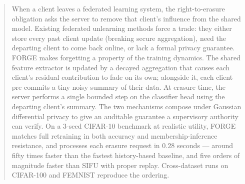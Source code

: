 \begin{abstract}
When a client leaves a federated learning system, the right-to-erasure obligation
asks the server to remove that client's influence from the shared model. Existing
federated unlearning methods force a trade: they either store every past client
update (breaking secure aggregation), need the departing client to come back
online, or lack a formal privacy guarantee. FORGE makes forgetting a property of
the training dynamics. The shared feature extractor is updated by a decayed
aggregation that causes each client's residual contribution to fade on its
own; alongside it, each client pre-commits a tiny noisy summary of their data.
At erasure time, the server performs a single bounded step on the classifier
head using the departing client's summary. The two mechanisms compose under
Gaussian differential privacy to give an auditable guarantee a supervisory
authority can verify. On a 3-seed CIFAR-10 benchmark at realistic utility,
FORGE matches full retraining in both accuracy and membership-inference
resistance, and processes each erasure request in $0.28$ seconds --- around
fifty times faster than the fastest history-based baseline, and five orders of
magnitude faster than SIFU with proper replay. Cross-dataset runs on CIFAR-100
and FEMNIST reproduce the ordering.
\end{abstract}
